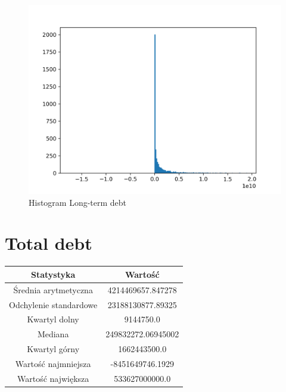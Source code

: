 \documentclass{article}
\begin{document}
\begin{figure}[h!]
    \includegraphics[width=\linewidth]{variables/Long-term debt.png}
    \caption{Histogram Long-term debt }
\end{figure}\section{ Total debt }

\begin{center}
    \begin{tabular}{|c | c|} 
    \hline
    Statystyka & Wartość \\
    \hline\hline
    Średnia arytmetyczna & 4214469657.847278 \\ 
    \hline
    Odchylenie standardowe & 23188130877.89325 \\
    \hline
    Kwartyl dolny & 9144750.0 \\
    \hline
    Mediana & 249832272.06945002 \\
    \hline
    Kwartyl górny & 1662443500.0 \\
    \hline
    Wartość najmniejsza & -8451649746.1929 \\
    \hline
    Wartość największa & 533627000000.0 \\
    \hline
   \end{tabular}
\end{center}
\end{document}
